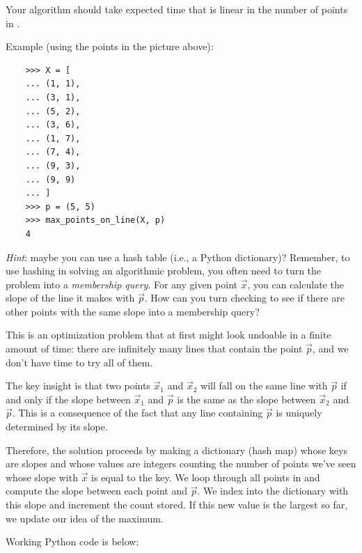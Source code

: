 \begin{progprob}
    Your algorithm should take expected time that is linear in the number of points in
    .

    Example (using the points in the picture above):

    \begin{verbatim}
    >>> X = [
    ... (1, 1),
    ... (3, 1),
    ... (5, 2),
    ... (3, 6),
    ... (1, 7),
    ... (7, 4),
    ... (9, 3),
    ... (9, 9)
    ... ]
    >>> p = (5, 5)
    >>> max_points_on_line(X, p)
    4
    \end{verbatim}

    \emph{Hint}: maybe you can use a hash table (i.e., a Python dictionary)?
    Remember, to use hashing in solving an algorithmic problem, you often
    need to turn the problem into a \emph{membership query}. For any given
    point $\vec x$, you can calculate the slope of the line it makes with $\vec
    p$. How can you turn checking to see if there are other points with the
    same slope into a membership query?

    \begin{soln}
        This is an optimization problem that at first might look undoable in a finite
        amount of time: there are infinitely many lines that contain the point $\vec p$,
        and we don't have time to try all of them.

        The key insight is that two points $\vec x_1$ and $\vec x_2$ will fall on the
        same line with $\vec p$ if and only if the slope between $\vec x_1$ and $\vec p$
        is the same as the slope between $\vec x_2$ and $\vec p$. This is a consequence
        of the fact that any line containing $\vec p$ is uniquely determined by its slope.

        Therefore, the solution proceeds by making a dictionary (hash map)
        whose keys are slopes and whose values are integers counting the number of points
        we've seen whose slope with $\vec x$ is equal to the key. We loop through all
        points in  and compute the slope between each point and $\vec p$.
        We index into the dictionary with this slope and increment the count
        stored. If this new value is the largest so far, we update our idea of
        the maximum.

        Working Python code is below:

        \inputminted{python}{\thisdir/include-solution/max_points_on_line.py}
    \end{soln}

\end{progprob}
